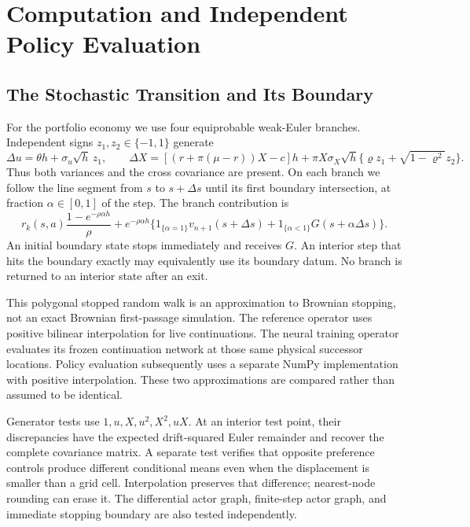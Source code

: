 \section{Computation and Independent Policy Evaluation}
\label{sec:computation}
\subsection{The Stochastic Transition and Its Boundary}
For the portfolio economy we use four equiprobable weak-Euler branches. Independent signs $z_1,z_2\in\{-1,1\}$ generate
\begin{equation}
 \Delta u=\theta h+\sigma_u\sqrt h\,z_1,\qquad
 \Delta X=[(r+\pi(\mu-r))X-c]h+
 \pi X\sigma_X\sqrt h\{\varrho z_1+\sqrt{1-\varrho^2}z_2\}.
 \label{eq:ndu_transition}
\end{equation}
Thus both variances and the cross covariance are present. On each branch we follow the line segment from $s$ to $s+\Delta s$ until its first boundary intersection, at fraction $\alpha\in[0,1]$ of the step. The branch contribution is
\begin{equation}
 r_k(s,a)\frac{1-e^{-\rho\alpha h}}{\rho}
 +e^{-\rho\alpha h}\big\{
     1_{\{\alpha=1\}}v_{n+1}(s+\Delta s)
     +1_{\{\alpha<1\}}G(s+\alpha\Delta s)\big\}.
 \label{eq:ndu_stopped_backup}
\end{equation}
An initial boundary state stops immediately and receives $G$. An interior step that hits the boundary exactly may equivalently use its boundary datum. No branch is returned to an interior state after an exit.

This polygonal stopped random walk is an approximation to Brownian stopping, not an exact Brownian first-passage simulation. The reference operator uses positive bilinear interpolation for live continuations. The neural training operator evaluates its frozen continuation network at those same physical successor locations. Policy evaluation subsequently uses a separate NumPy implementation with positive interpolation. These two approximations are compared rather than assumed to be identical.

Generator tests use $1,u,X,u^2,X^2,uX$. At an interior test point, their discrepancies have the expected drift-squared Euler remainder and recover the complete covariance matrix. A separate test verifies that opposite preference controls produce different conditional means even when the displacement is smaller than a grid cell. Interpolation preserves that difference; nearest-node rounding can erase it. The differential actor graph, finite-step actor graph, and immediate stopping boundary are also tested independently.

